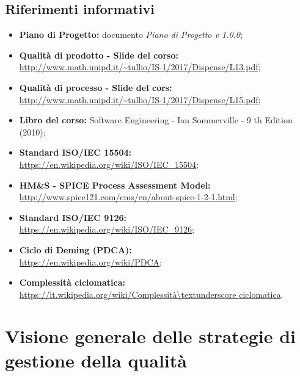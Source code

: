 \documentclass[openany,12pt,a4paper]{report}
\begin{document}
    \section{Riferimenti informativi}
    
    \begin{itemize}
        \item \textbf{Piano di Progetto:} documento \textit{Piano di Progetto v 1.0.0};
        
        \item \textbf{Qualità di prodotto - Slide del corso:} 
        \\ \url{http://www.math.unipd.it/~tullio/IS-1/2017/Dispense/L13.pdf};
        
        \item \textbf{Qualità di processo - Slide del cors:} \\ \url{http://www.math.unipd.it/~tullio/IS-1/2017/Dispense/L15.pdf};
        
        \item \textbf{Libro del corso:} Software Engineering - Ian Sommerville - 9 th Edition (2010);
        
        \item \textbf{Standard ISO/IEC 15504:} 
        \\ \url{https://en.wikipedia.org/wiki/ISO/IEC_15504};
        
        \item \textbf{HM\&S - SPICE Process Assessment Model:} 
        \\ \url{http://www.spice121.com/cms/en/about-spice-1-2-1.html};
        
        \item \textbf{Standard ISO/IEC 9126:}
        \\ \url{https://en.wikipedia.org/wiki/ISO/IEC_9126};
        
        \item \textbf{Ciclo di Deming (PDCA):} 
        \\ \url{https://en.wikipedia.org/wiki/PDCA};
        
        \item \textbf{Complessità ciclomatica:} 
        \\ \url{https://it.wikipedia.org/wiki/Complessità\textunderscore ciclomatica}.
    \end{itemize}


\chapter{Visione generale delle strategie di gestione della qualità}
    
\end{document}
